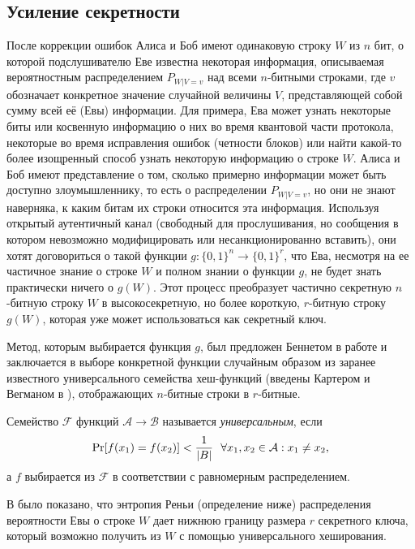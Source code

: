 \subsection{Усиление секретности}
После коррекции ошибок Алиса и Боб имеют одинаковую строку $W$ из $n$ бит, о которой подслушивателю Еве известна некоторая информация, описываемая вероятностным распределением $P_{W|V=v}$ над всеми $n$-битными строками, где $v$ обозначает конкретное значение случайной величины $V$, представляющей собой сумму всей её (Евы) информации. Для примера, Ева может узнать некоторые биты или косвенную информацию о них во время квантовой части протокола, некоторые во время исправления ошибок (четности блоков) или найти какой-то более изощренный способ узнать некоторую информацию о строке $W$. Алиса и Боб имеют представление о том, сколько примерно информации может быть доступно злоумышленнику, то есть о распределении $P_{W|V=v}$, но они не знают наверняка, к каким битам их строки относится эта информация. Используя открытый аутентичный канал (свободный для прослушивания, но сообщения в котором невозможно модифицировать или несанкционированно вставить), они хотят договориться о такой функции $g: \{0, 1\}^n \rightarrow \{
0,1\}^r$, что Ева, несмотря на ее частичное знание о строке $W$ и полном знании о функции $g$, не будет знать практически ничего о $g(W)$. Этот процесс преобразует частично секретную $n$-битную строку $W$ в высокосекретную, но более короткую, $r$-битную строку $g(W)$, которая уже может использоваться как секретный ключ.

Метод, которым выбирается функция $g$, был предложен Беннетом в работе \cite{privacy_amplification_by_public_discussion} и заключается в выборе конкретной функции случайным образом из заранее известного универсального семейства хеш-функций (введены Картером и Вегманом в \cite{universal_hashing}), отображающих $n$-битные строки в $r$-битные.

\begin{definition}
  Семейство $\mathcal{F}$ функций $\mathcal{A}\rightarrow\mathcal{B}$ называется \textit{универсальным}, если 
  $$  \operatorname{Pr}[f(x_1) = f(x_2)] < \frac{1}{|B|} ~~\forall x_1, x_2 \in \mathcal{A}: x_1 \neq x_2, $$ а $f$ выбирается из $\mathcal{F}$ в соответствии с равномерным распределением.
\end{definition}

В \cite{privacy_amplification} было показано, что энтропия Реньи (определение ниже) распределения вероятности Евы о строке $W$ дает нижнюю границу размера $r$ секретного ключа, который возможно получить из $W$ с помощью универсального хеширования.

